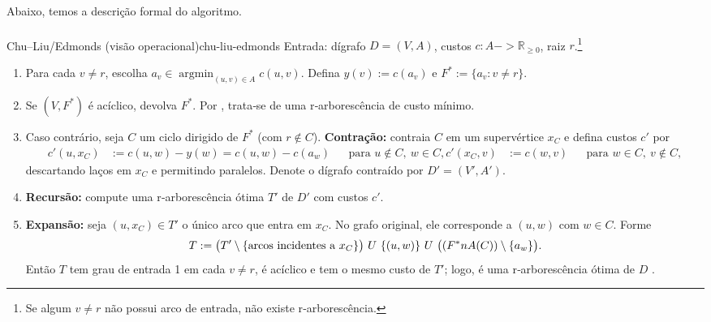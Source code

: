 \documentclass[12pt,a4paper]{article}
\def\\{}%
\def\cup{\string U}%
\def\cap{\string n}%
\def\to{->}%
\begin{document}
\paragraph{}
Abaixo, temos a descrição formal do algoritmo.
\paragraph{}
\begin{algobox}{Chu–Liu/Edmonds (visão operacional)}{chu-liu-edmonds}
Entrada: dígrafo \(D=(V,A)\), custos \(c:A\to\mathbb{R}_{\ge 0}\), raiz \(r\).\footnote{Se algum \(v\neq r\) não possui arco de entrada, não existe r‑arborescência.}
\begin{enumerate}\setlength{\itemsep}{2pt}
    \item Para cada \(v\neq r\), escolha \(a_v\in\operatorname*{argmin}_{(u,v)\in A} c(u,v)\). Defina \(y(v):=c(a_v)\) e \(F^*:=\{a_v: v\neq r\}.\)
    \item Se \((V,F^*)\) é acíclico, devolva \(F^*\). Por \cite[Obs.~4.36]{kleinberg2006}, trata‑se de uma r‑arborescência de custo mínimo.
    \item Caso contrário, seja \(C\) um ciclo dirigido de \(F^*\) (com \(r\notin C\)). \textbf{Contração:} contraia \(C\) em um supervértice \(x_C\) e defina custos \(c'\) por
    \begin{align*}
        c'(u,x_C) &:= c(u,w) - y(w) = c(u,w) - c(a_w) && \text{para } u\notin C,\ w\in C, \\
        c'(x_C,v) &:= c(w,v) && \text{para } w\in C,\ v\notin C,
    \end{align*}
    descartando laços em \(x_C\) e permitindo paralelos. Denote o dígrafo contraído por \(D'=(V',A')\).
    \item \textbf{Recursão:} compute uma r‑arborescência ótima \(T'\) de \(D'\) com custos \(c'\).
    \item \textbf{Expansão:} seja \((u,x_C)\in T'\) o único arco que entra em \(x_C\). No grafo original, ele corresponde a \((u,w)\) com \(w\in C\). Forme
    \[
        T := \bigl(T'\setminus\{\text{arcos incidentes a } x_C\}\bigr)\ \cup\ \{(u,w)\}\ \cup\ \bigl((F^*\cap A(C))\setminus\{a_w\}\bigr).
    \]
    Então \(T\) tem grau de entrada 1 em cada \(v\neq r\), é acíclico e tem o mesmo custo de \(T'\); logo, é uma r‑arborescência ótima de \(D\) \cite[Sec.~4.9]{kleinberg2006,schrijver2003comb}.
\end{enumerate}
\end{algobox}
\end{document}
